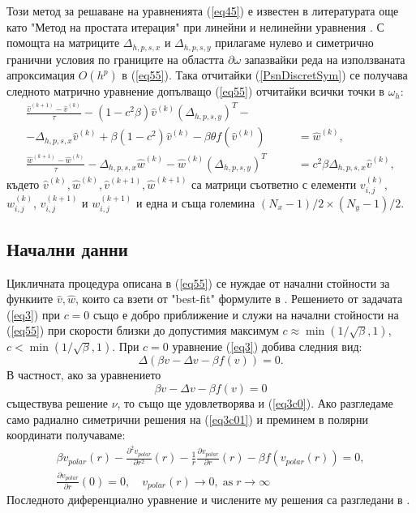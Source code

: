 \documentclass{article}
\newcommand{\be}{\begin{equation}}
\newcommand{\ee}{\end{equation}}
\newcommand{\rf}[1]{(\ref{#1})}
\begin{document}
Този метод за решаване на уравненията \rf{eq45} е известен в литературата още като "Метод на простата итерация" при линейни и нелинейни уравнения \cite{sam}. С помощта на матриците $\Delta_{h,p,s,x}$ и $\Delta_{h,p,s,y}$ прилагаме нулево и симетрично гранични условия по границите на областта $\partial \omega$ запазвайки реда на използваната апроксимация $O(h^p)$ в \rf{eq55}. Така отчитайки \rf{PsnDiscretSym} се получава следното матрично уравнение допълващо \rf{eq55} отчитайки всички точки в $\omega_h$:
\begin{equation}\label{eq555}
\begin{split}
\frac {\widehat{v}^{(k+1)}-\widehat{v}^{(k)}}{\tau}- (1-c^2 \beta) \widehat{v}^{(k)}  (\Delta_{h,p,s,y})^T - \quad\quad\quad\;&\\
-\Delta_{h,p,s,x}  \widehat{v}^{(k)}+ \beta (1-c^2 ) \widehat{v}^{(k)} - \beta \theta f(\widehat{v}^{(k)}) &= \widehat{w}^{(k)}, \\
\frac  {\widehat{w}^{(k+1)} -\widehat{w}^{(k)}} {\tau} - \Delta_{h,p,s,x}  \widehat{w}^{(k)} - \widehat{w}^{(k)}  (\Delta_{h,p,s,y})^T &=  c^2 \beta \Delta_{h,p,s,x}  \widehat{v}^{(k)},
\end{split}
\end{equation}
където $\widehat{v}^{(k)}, \widehat{w}^{(k)}, \widehat{v}^{(k+1)}, \widehat{w}^{(k+1)}$ са матрици съответно с елементи ${v}_{i,j}^{(k)}$, ${w}_{i,j}^{(k)}$, ${v}_{i,j}^{(k+1)}$ и ${w}_{i,j}^{(k+1)}$ и една и съща големина $(N_x-1)/2 \times (N_y-1)/2$.
\subsection{Начални данни}
 Цикличната процедура описана в \rf{eq55} се нуждае от начални стойности за функиите $\widehat{v},\widehat{w}$, които са взети от "best-fit" формулите в \cite{Ch2011}. 
Решението от задачата \rf{eq3} при $c=0$ също е добро приближение и служи на начални стойности на \rf{eq55} при скорости близки до допустимия максимум $c \approx \min (1/ \sqrt{\beta},1)$, $c < \min (1/ \sqrt{\beta},1)$. При $c=0$ уравнение \rf{eq3} добива следния вид:
\be\label{eq3c0}
\Delta (\beta  v - \Delta v - \beta f(v)) = 0.
\ee
В частност, ако за уравнението 
\be\label{eq3c01}
\beta v - \Delta v - \beta f(v) = 0
\ee
съществува решение $\nu$, то също ще удовлетворява и \rf{eq3c0}. Ако разгледаме само радиално симетрични решения на \rf{eq3c01} и преминем в полярни координати получаваме:
\begin{align}\label{eq3c02}
\beta v_{polar}(r)  - \frac{ \partial^2 v_{polar} } {\partial r^2}(r) - \frac{1}{r} \frac{ \partial v_{polar} } {\partial r}(r)  - \beta f(v_{polar}(r)) = 0, \nonumber \\
\frac{ \partial v_{polar} } {\partial r}(0) = 0, \quad v_{polar}(r) \rightarrow 0, \; \text{as} \; r \rightarrow \infty
\end{align}
Последното диференциално уравнение и числените му решения са разгледани в \cite{ref1c0, ref2c0}.
\end{document}
